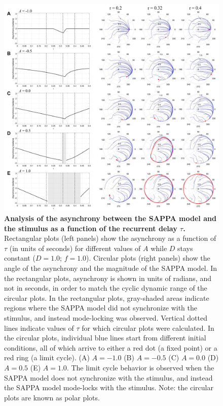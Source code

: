 \documentclass{report}
\begin{document}
\begin{figure}
    \centering
    \includegraphics[width=1.0\textwidth]{figures/figS_2.png}
    \caption[Analysis of the asynchrony between the SAPPA model and the stimulus as a function of the recurrent delay $\tau$]{\textbf{Analysis of the asynchrony between the SAPPA model and the stimulus as a function of the recurrent delay $\tau$.} Rectangular plots (left panels) show the asynchrony as a function of $\tau$ (in units of seconds) for different values of $A$ while $D$ stays constant ($D = 1.0$; $f = 1.0$). Circular plots (right panels) show the angle of the asynchrony and the magnitude of the SAPPA model. In the rectangular plots, asynchrony is shown in units of radians, and not in seconds, in order to match the cyclic dynamic range of the circular plots. In the rectangular plots, gray-shaded areas indicate regions where the SAPPA model did not synchronize with the stimulus, and instead mode-locking was observed. Vertical dotted lines indicate values of $\tau$ for which circular plots were calculated. In the circular plots, individual blue lines start from different initial conditions, all of which arrive to either a red dot (a fixed point) or a red ring (a limit cycle). (A) $A = -1.0$ (B) $A = -0.5$ (C) $A = 0.0$ (D) $A = 0.5$ (E) $A = 1.0$. The limit cycle behavior is observed when the SAPPA model does not synchronize with the stimulus, and instead the SAPPA model mode-locks with the stimulus. Note: the circular plots are known as polar plots.}
    \label{fS_2}
\end{figure}



\end{document}
